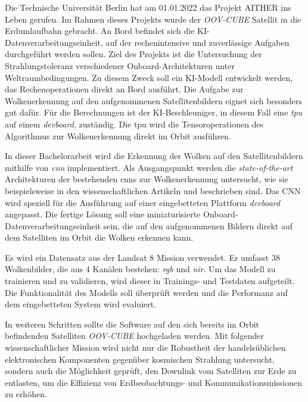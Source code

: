 {

\setlength{\parindent}{0pt}
\setlength{\parskip}{1em}


Die Technische Universität Berlin hat am 01.01.2022 das Projekt AITHER ins Leben gerufen.
Im Rahmen dieses Projekts wurde der \textit{OOV-CUBE} Satellit in die Erdumlaufbahn gebracht.
An Bord befindet sich die KI-Daten\-ver\-ar\-bei\-tungs\-ein\-heit, auf der rechenintensive und zuverlässige Aufgaben durchgeführt werden sollen.
Ziel des Projekts ist die Untersuchung der Strahlungstoleranz verschiedener Onboard-Architekturen unter Welt\-raum\-be\-ding\-un\-gen.
Zu diesem Zweck soll ein KI-Modell entwickelt werden, das Rechenoperationen direkt an Bord ausführt.
Die Aufgabe zur Wolkenerkennung auf den aufgenommenen Satellitenbildern eignet sich besonders gut dafür.
Für die Berechnungen ist der KI-Beschleuniger,
in diesem Fall eine \textit{\gls{tpu}} auf einem \textit{\gls{devboard}}, zuständig.
Die \gls{tpu} wird die Tensoroperationen des Algorithmus zur Wolkenerkennung direkt im Orbit ausführen.

In dieser Bachelorarbeit wird die Erkennung der Wolken auf den Satellitenbildern mithilfe von \textit{\gls{cnn}} implementiert.
Als Ausgangspunkt werden die \textit{state-of-the-art} Architekturen der bestehenden \glspl{cnn} zur Wolkenerkennung untersucht,
wie sie beispielsweise in den wissenschaftlichen Artikeln \cite{CloudNet2019} und \cite{CloudDet2018} beschrieben sind.
Das CNN wird speziell für die Ausführung auf einer eingebetteten Plattform \textit{\gls{devboard}} angepasst.
Die fertige Lösung soll eine miniaturisierte Onboard-Da\-ten\-ver\-ar\-bei\-tungs\-ein\-heit sein,
die auf den aufgenommenen Bildern direkt auf dem Satelliten im Orbit die Wolken erkennen kann.

Es wird ein Datensatz aus der Landsat 8 Mission verwendet.
Er umfasst 38 Wolkenbilder, die aus 4 Kanälen bestehen: \textit{\gls{rgb}} und \textit{\gls{nir}}.
Um das Modell zu trainieren und zu validieren, wird dieser in Trainings- und Testdaten aufgeteilt.
Die Funktionalität des Modells soll überprüft werden und die Performanz auf dem eingebetteten System wird evaluiert. 

In weiteren Schritten sollte die Software auf den sich bereits im Orbit befindenden Satelliten \textit{OOV-CUBE} hochgeladen werden.
Mit folgender wissenschaftlicher Mission wird nicht nur die Robustheit der handelsüblichen elektronischen Komponenten gegenüber
kosmischen Strahlung untersucht, sondern auch die Möglichkeit geprüft, den Downlink vom Satelliten zur Erde zu entlasten,
um die Effizienz von Erdbeobachtungs- und Kommunikationsmissionen zu erhöhen.


}
